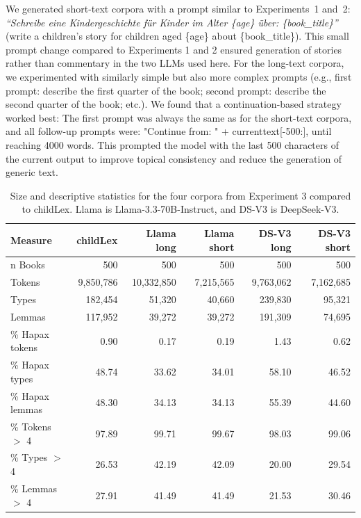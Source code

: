 \documentclass[doc, a4paper, anonymous]{apa7}
\begin{document}
We generated short-text corpora with a prompt similar to Experiments~1 and~2: \textit{``Schreibe eine Kindergeschichte für Kinder im Alter \{age\} über: \{book\_title\}''} (write a children’s story for children aged \{age\} about \{book\_title\}). This small prompt change compared to Experiments 1 and 2 ensured generation of stories rather than commentary in the two LLMs used here. For the long-text corpora, we experimented with similarly simple but also more complex prompts (e.g., first prompt: describe the first quarter of the book; second prompt: describe the second quarter of the book; etc.). We found that a continuation-based strategy worked best: The first prompt was always the same as for the short-text corpora, and all follow-up prompts were: "Continue from: " + currenttext[-500:], until reaching 4000 words. This prompted the model with the last 500 characters of the current output to improve topical consistency and reduce the generation of generic text. 


\begin{table}[!ht]
\caption{Size and descriptive statistics for the four corpora from Experiment 3 compared to childLex. Llama is Llama-3.3-70B-Instruct, and DS-V3 is DeepSeek-V3.}
\centering
\begin{tabular}{lrrrrr}
  \hline
Measure & childLex & Llama long & Llama short & DS-V3 long & DS-V3 short \\ 
  \hline
n Books & 500 & 500 & 500 & 500 & 500 \\ 
  Tokens & 9,850,786 & 10,332,850 & 7,215,565 & 9,763,062 & 7,162,685 \\ 
  Types & 182,454 & 51,320 & 40,660 & 239,830 & 95,321 \\ 
  Lemmas & 117,952 & 39,272 & 39,272 & 191,309 & 74,695 \\ 
  \% Hapax tokens & 0.90 & 0.17 & 0.19 & 1.43 & 0.62 \\ 
  \% Hapax types & 48.74 & 33.62 & 34.01 & 58.10 & 46.52 \\ 
  \% Hapax lemmas & 48.30 & 34.13 & 34.13 & 55.39 & 44.60 \\ 
  \% Tokens $>$ 4 & 97.89 & 99.71 & 99.67 & 98.03 & 99.06 \\ 
  \% Types $>$ 4 & 26.53 & 42.19 & 42.09 & 20.00 & 29.54 \\ 
  \% Lemmas $>$ 4 & 27.91 & 41.49 & 41.49 & 21.53 & 30.46 \\ 
   \hline
\end{tabular}
\label{freqComp3}
\end{table}
\end{document}

